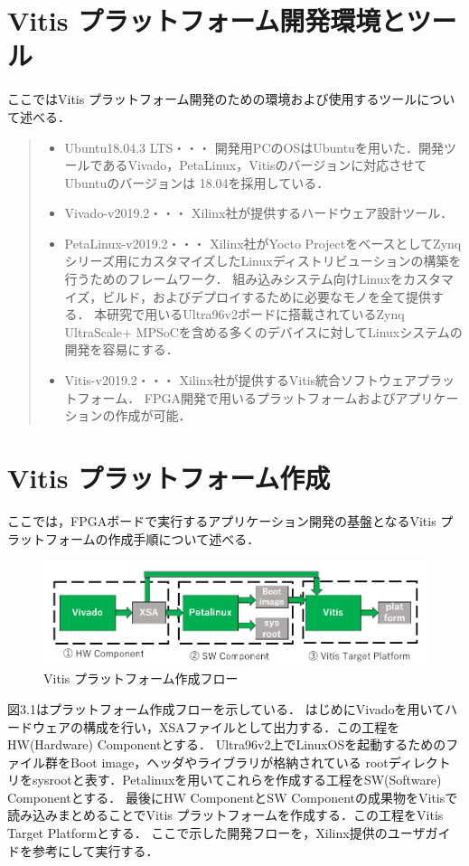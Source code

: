 \documentclass[11pt,a4j]{jreport}
\begin{document}
\section{Vitis プラットフォーム開発環境とツール}
ここではVitis プラットフォーム開発のための環境および使用するツールについて述べる．
\begin{quote}
  \begin{itemize}
    \item Ubuntu18.04.3 LTS・・・
    開発用PCのOSはUbuntuを用いた．開発ツールであるVivado，PetaLinux，Vitisのバージョンに対応させてUbuntuのバージョンは
    18.04を採用している．
    \item Vivado-v2019.2・・・
    Xilinx社が提供するハードウェア設計ツール．
    \item PetaLinux-v2019.2・・・
    Xilinx社がYocto ProjectをベースとしてZynqシリーズ用にカスタマイズしたLinuxディストリビューションの構築を行うためのフレームワーク．
    組み込みシステム向けLinuxをカスタマイズ，ビルド，およびデプロイするために必要なモノを全て提供する．
    本研究で用いるUltra96v2ボードに搭載されているZynq UltraScale+ MPSoCを含める多くのデバイスに対してLinuxシステムの開発を容易にする．
    \item Vitis-v2019.2・・・
    Xilinx社が提供するVitis統合ソフトウェアプラットフォーム．
    FPGA開発で用いるプラットフォームおよびアプリケーションの作成が可能．
  \end{itemize}
\end{quote}

\section{Vitis プラットフォーム作成}
ここでは，FPGAボードで実行するアプリケーション開発の基盤となるVitis プラットフォームの作成手順について述べる．
\begin{figure}[H]
  \center
  \includegraphics[scale = 0.8]{pict/pict7.jpg}
  \caption{Vitis プラットフォーム作成フロー}
\end{figure}
図3.1はプラットフォーム作成フローを示している．
はじめにVivadoを用いてハードウェアの構成を行い，XSAファイルとして出力する．この工程をHW(Hardware) Componentとする．
Ultra96v2上でLinuxOSを起動するためのファイル群をBoot image，ヘッダやライブラリが格納されている
rootディレクトリをsysrootと表す．Petalinuxを用いてこれらを作成する工程をSW(Software) Componentとする．
最後にHW ComponentとSW Componentの成果物をVitisで読み込みまとめることでVitis プラットフォームを作成する．この工程をVitis Target Platformとする．
ここで示した開発フローを，Xilinx提供のユーザガイド\cite{Xilinx-platform}を参考にして実行する．
\end{document}

